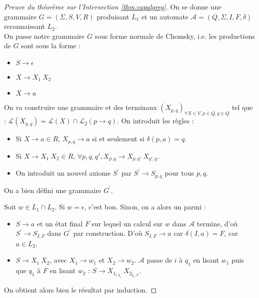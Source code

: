\documentclass{cours}
\begin{document}
\begin{proof}[Preuve du théorème sur l'Intersection \ref{thm:capalgreg}]
    On se donne une grammaire $G = \left(\Sigma, S, V, R\right)$ produisant $L_{1}$ et un automate $\mathcal{A} = \left(Q, \Sigma, I, F, \delta\right)$ reconnaissant $L_{2}$.\\
    On passe notre grammaire $G$ sous forme normale de Chomsky, i.e. les productions de $G$ sont sous la forme : 
    \begin{itemize}
        \item $S \rightarrow \epsilon$
        \item $X \rightarrow X_{1}\ X_{2}$
        \item $X \rightarrow a$
    \end{itemize}
    On va construire une grammaire et des terminaux $(X_{p, q})_{\forall X\in V, p\in Q, q \in Q}$ tel que : $\mathcal{L}(X_{p, q}) = \mathcal{L}(X) \cap \mathcal{L}_{2}(p \rightarrow q)$. On introduit les règles : 
    \begin{itemize}
        \item Si $X \rightarrow a \in R$, $X_{p, q} \rightarrow a$ si et seulement si $\delta(p, a) = q$.
        \item Si $X \rightarrow X_{1}\ X_{2} \in R$, $\forall p, q, q', X_{p, q} \rightarrow X_{p, q'} \ X_{q', q}$.
        \item On introduit un nouvel axiome $S^{'}$ par $S^{'} \rightarrow S_{p, q}$ pour tous $p, q$.
    \end{itemize}
    On a bien défini une grammaire $G^{'}$.
    
    Soit $w \in L_{1} \cap L_{2}$. Si $w = \epsilon$, c'est bon. 
    Sinon, on a alors un parmi :
    \begin{itemize}
        \item $S\rightarrow a$ et un état final $F$ sur lequel un calcul sur $w$ dans $\mathcal{A}$ termine, d'où $S^{'}\rightarrow S_{I, F}$ dans $G^{'}$ par construction. D'où $S_{I,F} \rightarrow a$ car $\delta(I, a) = F$, car $a\in L_{2}$.
        \item $S \rightarrow X_{1}\ X_{2}$, avec $X_{1} \rightarrow w_{1}$ et $X_{2} \rightarrow w_{2}$. $\mathcal{A}$ passe de $i$ à $q_{1}$ en lisant $w_{1}$ puis que $q_{1}$ à $F$ en lisant $w_{2}$ : $S\rightarrow X_{1_{i, q_{1}}}\ X_{2_{q_{1}, F}}$.
    \end{itemize}
    On obtient alors bien le résultat par induction.
\end{proof}
\end{document}

